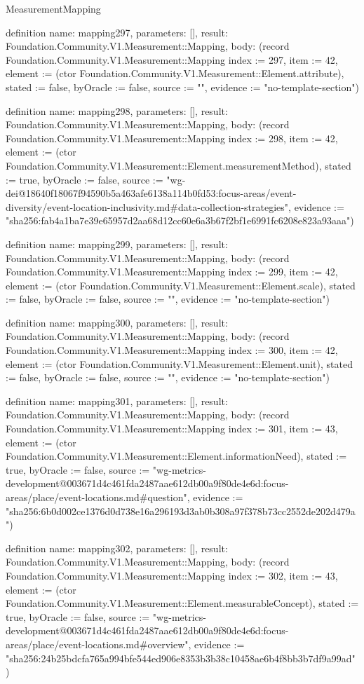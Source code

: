 \begin{lexlean}{MeasurementMapping}
\begin{semanticmodule}
definition{
  name: mapping297,
  parameters: [],
  result: Foundation.Community.V1.Measurement::Mapping,
  body: (record Foundation.Community.V1.Measurement::Mapping {index := 297, item := 42, element := (ctor Foundation.Community.V1.Measurement::Element.attribute), stated := false, byOracle := false, source := "", evidence := "no-template-section"})
}

definition{
  name: mapping298,
  parameters: [],
  result: Foundation.Community.V1.Measurement::Mapping,
  body: (record Foundation.Community.V1.Measurement::Mapping {index := 298, item := 42, element := (ctor Foundation.Community.V1.Measurement::Element.measurementMethod), stated := true, byOracle := false, source := "wg-dei@18640f18067f94590b5a463afe6138a114b0fd53:focus-areas/event-diversity/event-location-inclusivity.md#data-collection-strategies", evidence := "sha256:fab4a1ba7e39e65957d2aa68d12cc60e6a3b67f2bf1e6991fc6208e823a93aaa"})
}

definition{
  name: mapping299,
  parameters: [],
  result: Foundation.Community.V1.Measurement::Mapping,
  body: (record Foundation.Community.V1.Measurement::Mapping {index := 299, item := 42, element := (ctor Foundation.Community.V1.Measurement::Element.scale), stated := false, byOracle := false, source := "", evidence := "no-template-section"})
}

definition{
  name: mapping300,
  parameters: [],
  result: Foundation.Community.V1.Measurement::Mapping,
  body: (record Foundation.Community.V1.Measurement::Mapping {index := 300, item := 42, element := (ctor Foundation.Community.V1.Measurement::Element.unit), stated := false, byOracle := false, source := "", evidence := "no-template-section"})
}

definition{
  name: mapping301,
  parameters: [],
  result: Foundation.Community.V1.Measurement::Mapping,
  body: (record Foundation.Community.V1.Measurement::Mapping {index := 301, item := 43, element := (ctor Foundation.Community.V1.Measurement::Element.informationNeed), stated := true, byOracle := false, source := "wg-metrics-development@003671d4c461fda2487aae612db00a9f80de4e6d:focus-areas/place/event-locations.md#question", evidence := "sha256:6b0d002ce1376d0d738e16a296193d3ab0b308a97f378b73cc2552de202d479a"})
}

definition{
  name: mapping302,
  parameters: [],
  result: Foundation.Community.V1.Measurement::Mapping,
  body: (record Foundation.Community.V1.Measurement::Mapping {index := 302, item := 43, element := (ctor Foundation.Community.V1.Measurement::Element.measurableConcept), stated := true, byOracle := false, source := "wg-metrics-development@003671d4c461fda2487aae612db00a9f80de4e6d:focus-areas/place/event-locations.md#overview", evidence := "sha256:24b25bdcfa765a994bfe544ed906e8353b3b38c10458ae6b4f8bb3b7df9a99ad"})
}


\end{semanticmodule}
\end{lexlean}

